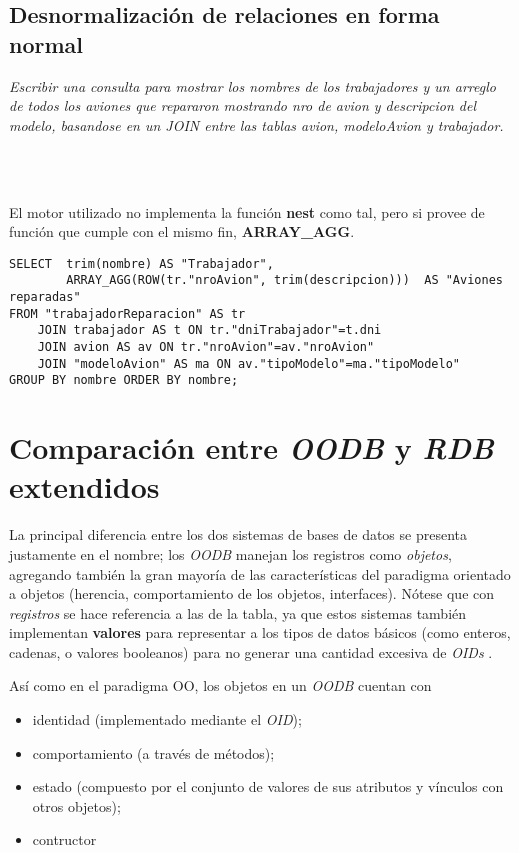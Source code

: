 \subsection{Desnormalización de relaciones en forma normal}
\emph{Escribir una consulta para mostrar los nombres de los trabajadores y un arreglo de todos los aviones que repararon mostrando nro de avion y descripcion del modelo, basandose en un JOIN entre las tablas avion, modeloAvion y trabajador.} 

\\~

El motor utilizado no implementa la función \textbf{nest} como tal, pero si provee de función que cumple con el mismo fin, \textbf{ARRAY\_AGG}. 

\vspace*{5mm}
\lstset{style=sql}
\begin{lstlisting}
SELECT  trim(nombre) AS "Trabajador", 
        ARRAY_AGG(ROW(tr."nroAvion", trim(descripcion)))  AS "Aviones reparadas"
FROM "trabajadorReparacion" AS tr 
    JOIN trabajador AS t ON tr."dniTrabajador"=t.dni 
    JOIN avion AS av ON tr."nroAvion"=av."nroAvion" 
    JOIN "modeloAvion" AS ma ON av."tipoModelo"=ma."tipoModelo" 
GROUP BY nombre ORDER BY nombre;
\end{lstlisting}



\section{Comparación entre \emph{OODB} y \emph{RDB} extendidos}

La principal diferencia entre los dos sistemas de bases de datos se presenta justamente en el nombre; los \emph{OODB} manejan los registros  como \emph{objetos}, agregando también la gran mayoría de las características del paradigma orientado a objetos (herencia, comportamiento de los objetos, interfaces). Nótese que con \emph{registros} se hace referencia a las  de la tabla, ya que estos sistemas también implementan \textbf{valores} para representar a los tipos de datos básicos (como enteros, cadenas, o valores booleanos) para no generar una cantidad excesiva de \emph{OIDs} \cite{elmasri}.

Así como en el paradigma OO, los objetos en un \emph{OODB} cuentan con
\begin{itemize}
    \item identidad (implementado mediante el \emph{OID});
    \item comportamiento (a través de métodos);
    \item estado (compuesto por el conjunto de valores de sus atributos y vínculos con otros objetos);
    \item contructor
\end{itemize}

